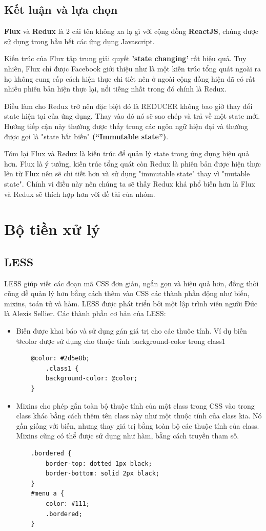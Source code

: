 \subsection{Kết luận và lựa chọn}
\textbf{Flux} và \textbf{Redux} là 2 cái tên không xa lạ gì với cộng đồng \textbf{ReactJS}, chúng được sử dụng trong hầu hết các ứng dụng Javascript.


Kiến trúc của Flux tập trung giải quyết \textbf{'state changing'} rất hiệu quả. Tuy nhiên, Flux chỉ được Facebook giới thiệu như là một kiến trúc tổng quát ngoài ra họ không cung cấp cách hiện thực chi tiết nên ở ngoài cộng đồng hiện đã có rất nhiều phiên bản hiện thực lại, nổi tiếng nhất trong đó chính là Redux.


Điều làm cho Redux trở nên đặc biệt đó là REDUCER không bao giờ thay đổi state hiện tại của ứng dụng. Thay vào đó nó sẽ sao chép và trả về một state mới. Hướng tiếp cận này thường được thấy trong các ngôn ngữ hiện đại và thường được gọi là "state bất biến" \textbf{(“Immutable state”)}.


Tóm lại Flux và Redux là kiến trúc để quản lý state trong ứng dụng hiệu quả hơn. Flux là ý tưởng, kiến trúc tổng quát còn Redux là phiên bản được hiện thực lên từ Flux nên sẽ chi tiết hơn và sử dụng "immutable state" thay vì "mutable state". Chính vì điều này nên chúng ta sẽ thấy Redux khá phổ biến hơn là Flux và Redux sẽ thích hợp hơn với đề tài của nhóm.
\section{Bộ tiền xử lý}
\subsection{LESS}
LESS giúp viết các đoạn mã CSS đơn giản, ngắn gọn và hiệu quả hơn, đồng thời cũng dễ quản lý hơn bằng cách thêm vào CSS các thành phần động như biến, mixins, toán tử và hàm. LESS được phát triển bởi một lập trình viên người Đức là Alexis Sellier. Các thành phần cơ bản của LESS:
\begin{itemize}
	\item Biến được khai báo và sử dụng gán giá trị cho các thuôc tính. Ví dụ biến @color được sử dụng cho thuộc tính background-color trong class1
	\begin{verbatim}
	@color: #2d5e8b;
		.class1 {
		background-color: @color;
	}
	\end{verbatim}
	\item Mixins cho phép gắn toàn bộ thuộc tính của một class trong CSS vào trong class khác bằng cách thêm tên class này như một thuộc tính của class kia. Nó gần giống với biến, nhưng thay giá trị bằng toàn bộ các thuộc tính của class. Mixins cũng có thể được sử dụng như hàm, bằng cách truyền tham số.
	\begin{verbatim}
	.bordered {
		border-top: dotted 1px black;
		border-bottom: solid 2px black;
	}
	#menu a {
		color: #111;
		.bordered;
	}
	\end{verbatim}
\end{itemize}

